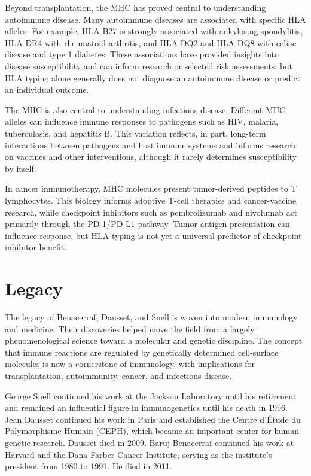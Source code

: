 Beyond transplantation, the MHC has proved central to understanding autoimmune disease. Many autoimmune diseases are associated with specific HLA alleles. For example, HLA-B27 is strongly associated with ankylosing spondylitis, HLA-DR4 with rheumatoid arthritis, and HLA-DQ2 and HLA-DQ8 with celiac disease and type 1 diabetes. These associations have provided insights into disease susceptibility and can inform research or selected risk assessments, but HLA typing alone generally does not diagnose an autoimmune disease or predict an individual outcome.

The MHC is also central to understanding infectious disease. Different MHC alleles can influence immune responses to pathogens such as HIV, malaria, tuberculosis, and hepatitis B. This variation reflects, in part, long-term interactions between pathogens and host immune systems and informs research on vaccines and other interventions, although it rarely determines susceptibility by itself.

In cancer immunotherapy, MHC molecules present tumor-derived peptides to T lymphocytes. This biology informs adoptive T-cell therapies and cancer-vaccine research, while checkpoint inhibitors such as pembrolizumab and nivolumab act primarily through the PD-1/PD-L1 pathway. Tumor antigen presentation can influence response, but HLA typing is not yet a universal predictor of checkpoint-inhibitor benefit.

\section{Legacy}

The legacy of Benacerraf, Dausset, and Snell is woven into modern immunology and medicine. Their discoveries helped move the field from a largely phenomenological science toward a molecular and genetic discipline. The concept that immune reactions are regulated by genetically determined cell-surface molecules is now a cornerstone of immunology, with implications for transplantation, autoimmunity, cancer, and infectious disease.

George Snell continued his work at the Jackson Laboratory until his retirement and remained an influential figure in immunogenetics until his death in 1996. Jean Dausset continued his work in Paris and established the Centre d'\'Etude du Polymorphisme Humain (CEPH), which became an important center for human genetic research. Dausset died in 2009. Baruj Benacerraf continued his work at Harvard and the Dana-Farber Cancer Institute, serving as the institute's president from 1980 to 1991. He died in 2011.


